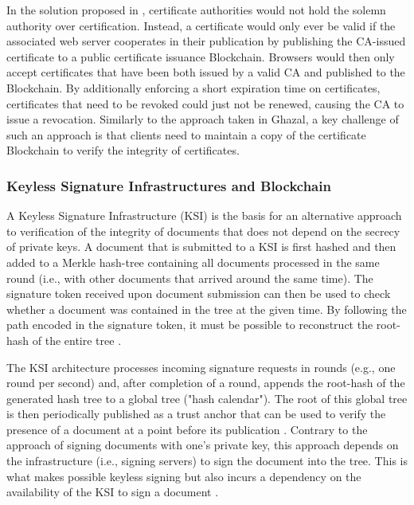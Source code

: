 In the solution proposed in \cite{zohar_blockchain-based_2019}, certificate authorities would not hold the solemn authority over certification. Instead, a certificate would only ever be valid if the associated web server cooperates in their publication by publishing the CA-issued certificate to a public certificate issuance Blockchain. Browsers would then only accept certificates that have been both issued by a valid CA and published to the Blockchain. By additionally enforcing a short expiration time on certificates, certificates that need to be revoked could just not be renewed, causing the CA to issue a revocation. Similarly to the approach taken in Ghazal, a key challenge of such an approach is that clients need to maintain a copy of the certificate Blockchain to verify the integrity of certificates.


\subsubsection{Keyless Signature Infrastructures and Blockchain}

A Keyless Signature Infrastructure (KSI) is the basis for an alternative approach to verification of the integrity of documents that does not depend on the secrecy of private keys. A document that is submitted to a KSI is first hashed and then added to a Merkle hash-tree containing all documents processed in the same round (i.e., with other documents that arrived around the same time). The signature token received upon document submission can then be used to check whether a document was contained in the tree at the given time. By following the path encoded in the signature token, it must be possible to reconstruct the root-hash of the entire tree \cite{hutchison_keyless_2013, jamthagen_blockchain-based_2016}.

The KSI architecture processes incoming signature requests in rounds (e.g., one round per second) and, after completion of a round, appends the root-hash of the generated hash tree to a global tree ("hash calendar"). The root of this global tree is then periodically published as a trust anchor that can be used to verify the presence of a document at a point before its publication \cite{hutchison_keyless_2013}. Contrary to the approach of signing documents with one's private key, this approach depends on the infrastructure (i.e., signing servers) to sign the document into the tree. This is what makes possible keyless signing but also incurs a dependency on the availability of the KSI to sign a document \cite{jamthagen_blockchain-based_2016}.

